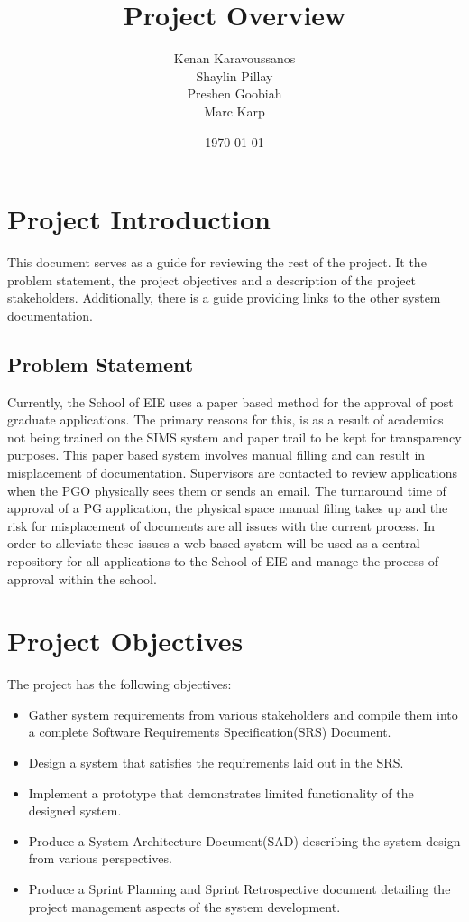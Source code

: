 \documentclass[11pt]{article}
\title{Project Overview}
\author{ Kenan Karavoussanos \\ Shaylin Pillay \\ Preshen Goobiah \\Marc Karp}
\date{\today}
\begin{document}
\maketitle
\section{Project Introduction}
This document serves as a guide for reviewing the rest of the project. It the problem statement, the project objectives and a description of the project stakeholders. Additionally, there is a guide providing links to the other system documentation.

\subsection{Problem Statement}
Currently, the School of EIE uses a paper based method for the approval of post graduate applications. The primary reasons for this, is as a result of academics not being trained on the SIMS system and paper trail to be kept for transparency purposes. This paper based system involves manual filling and can result in misplacement of documentation. Supervisors are contacted to review applications when the PGO physically sees them or sends an email. The turnaround time of approval of a PG application, the physical space manual filing takes up and the risk for misplacement of documents are all issues with the current process. In order to alleviate these issues a web based system will be used as a central repository for all applications to the School of EIE and manage the process of approval within the school.

\section{Project Objectives}
The project has the following objectives:
\begin{itemize}
	\item Gather system requirements from various stakeholders and compile them into a complete Software Requirements Specification(SRS) Document.
	\item Design a system that satisfies the requirements laid out in the SRS.
	\item Implement a prototype that demonstrates limited functionality of the designed system.
	\item Produce a System Architecture Document(SAD) describing the system design from various perspectives.
	\item Produce a Sprint Planning and Sprint Retrospective document detailing the project management aspects of the system development.
\end{itemize}
\end{document}
